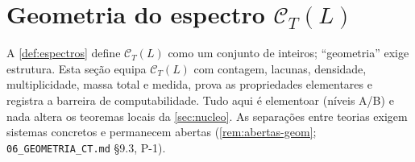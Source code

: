 \documentclass[11pt,a4paper]{article}
\theoremstyle{definition}
\theoremstyle{remark}
\begin{document}
\section{Geometria do espectro $\mathcal{C}_{T}(L)$}\label{sec:geometria}

A \cref{def:espectros} define $\mathcal{C}_T(L)$ como um conjunto de
inteiros; ``geometria'' exige estrutura. Esta seção equipa
$\mathcal{C}_T(L)$ com contagem, lacunas, densidade, multiplicidade,
massa total e medida, prova as propriedades elementares e registra a
barreira de computabilidade. Tudo aqui é elementoar (níveis A/B) e nada
altera os teoremas locais da \cref{sec:nucleo}. As separações entre
teorias exigem sistemas concretos e permanecem abertas
(\cref{rem:abertas-geom}; \texttt{06\_GEOMETRIA\_CT.md} §9.3, P-1).
\end{document}
